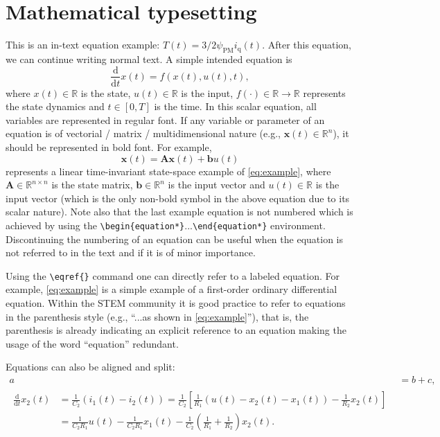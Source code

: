 \section{Mathematical typesetting}
\label{subsec:normalization}
This is an in-text equation example: $T(t)=3/2\psi_{\mathrm{PM}}i_{\mathrm{q}}(t)$. After this equation, we can continue writing normal text. A simple intended equation is
\begin{equation}
	\label{eq:example}
	\frac{\mathrm{d}}{\mathrm{d}t}x(t) = f(x(t),u(t),t),
\end{equation}
where $x(t)\in\mathbb{R}$ is the state, $u(t)\in\mathbb{R}$ is the input, $f(\cdot)\in\mathbb{R}\rightarrow\mathbb{R}$ represents the state dynamics and $t\in\left[0,T\right]$ is the time. In this scalar equation, all variables are represented in regular font. If any variable or parameter of an equation is of vectorial / matrix / multidimensional nature (e.g., $\bm{x}(t)\in\mathbb{R}^n$), it should be represented in bold font. For example,
\begin{equation*}
	\bm{x}(t) = \bm{A}\bm{x}(t) + \bm{b}u(t)
\end{equation*}
represents a linear time-invariant state-space example of  \eqref{eq:example}, where $\bm{A}\in\mathbb{R}^{n\times n}$ is the state matrix, $\bm{b}\in\mathbb{R}^{n}$ is the input vector and $u(t)\in\mathbb{R}$ is the input vector (which is the only non-bold symbol in the above equation due to its scalar nature). Note also that the last example equation is not numbered which is achieved by using the \verb|\begin{equation*}|...\verb|\end{equation*}| environment. Discontinuing the numbering of an equation can be useful when the equation is not referred to in the text and if it is of minor importance.

Using the \verb|\eqref{}| command one can directly refer to a labeled equation. For example, \eqref{eq:example} is a simple example of a first-order ordinary differential equation. Within the STEM community it is good practice to refer to equations in the parenthesis style (e.g., ``...as shown in \eqref{eq:example}''), that is, the parenthesis is already indicating an explicit reference to an equation making the usage of the word ``equation'' redundant. 


Equations can also be aligned and split:
\begin{align}
    a&=b+c,\\
    \begin{split}
        \frac{\mathrm{d}}{\mathrm{d}t}x_2(t)&= \frac{1}{C_2} \left( i_1(t)-i_2(t)\right)= \frac{1}{C_2} \left[ \frac{1}{R_1} \left(u(t)-x_2(t)-x_1(t) \right)-\frac{1}{R_2} x_2(t)\right]\\
        &= \frac{1}{C_2 R_1} u(t)-\frac{1}{C_2 R_1} x_1(t) - \frac{1}{C_2} \left( \frac{1}{R_1}+\frac{1}{R_2}\right) x_2(t). 
        \label{eq:splitline}
    \end{split}
\end{align}

